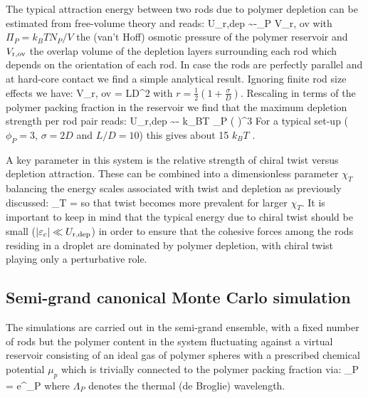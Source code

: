  The typical attraction energy between two rods due to polymer depletion can be estimated from free-volume theory \cite{LekkerkerkerTuinier2011} and reads:
 \beq
 U_{\rm r,dep} \sim -\Pi_{P} V_{\rm r, ov}
 \eeq
with $ \Pi_{P} = k_{B} T N_{P}/V$ the (van't Hoff) osmotic pressure of the polymer reservoir and $V_{\rm r, ov}$ the overlap volume  of the depletion layers surrounding each rod which depends on the orientation of each rod. In case the rods are perfectly parallel and at hard-core contact we find a simple analytical result. Ignoring  finite rod size effects we have:
\beq
V_{\rm r, ov} = LD^{2} 
\eeq
with $r = \tfrac{1}{2}(1 + \tfrac{\sigma}{D})$. Rescaling in terms of the polymer packing fraction in the reservoir we find that the maximum depletion strength per rod pair  reads:
\beq
  U_{\rm r,dep} \sim - k_{B}T \phi_{P}   \left (  \right )^{3} 
 \eeq
For a typical set-up ($\phi_{P} =3$, $\sigma = 2D$ and $L/D=10$) this gives about 15 $k_{B}T$ .

A key parameter in this system is the relative strength of chiral twist versus depletion attraction. These can be combined into a dimensionless parameter $\chi_{T}$ balancing the energy scales associated with twist and depletion as previously discussed:
\beq
\chi_{T} =  
\eeq
so that twist becomes more prevalent for larger $\chi_{T}$. It is important to keep in mind that the typical energy due to chiral twist should be small ($ | \varepsilon_{c} | \ll U_{\rm r,dep} $) in order to ensure that the cohesive forces among the rods residing in a droplet are dominated by polymer depletion, with chiral twist playing only a perturbative role.

\subsection{Semi-grand canonical Monte Carlo simulation}

The simulations are carried out in the semi-grand ensemble, with a fixed number of rods but the polymer content in the system fluctuating against a virtual reservoir consisting of an ideal gas of polymer spheres with a prescribed chemical potential  $\mu_{p}$ which is trivially connected to the polymer packing fraction via:
\beq
\phi_{P} =  e^{\beta \mu_{P}}
\eeq
where $\Lambda_{P}$ denotes the thermal (de Broglie) wavelength.

